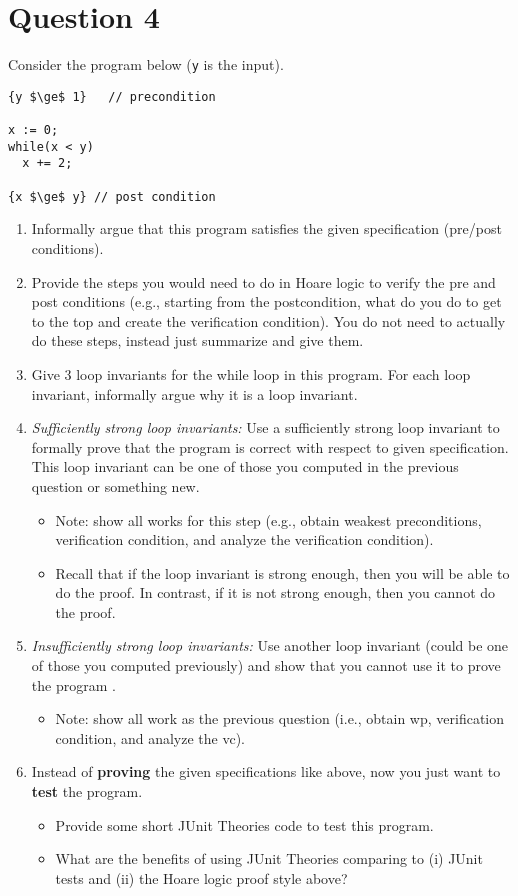 \documentclass[10pt]{article}
\begin{document}
\newpage
\section{Question 4}

Consider the program below (\texttt{y} is the input). 
\begin{lstlisting}
{y $\ge$ 1}   // precondition

x := 0;
while(x < y)
  x += 2;

{x $\ge$ y} // post condition
\end{lstlisting}


\begin{enumerate}
\item Informally argue that this program satisfies the given specification (pre/post conditions).
\item Provide the steps you would need to do in Hoare logic to verify the pre and post conditions (e.g., starting from the postcondition, what do you do to get to the top and create the verification condition). You do not need to actually do these steps, instead just summarize and give them.
  
\item Give 3 loop invariants for the while loop in this program. For each loop invariant, informally argue why it is a loop invariant.  
\item \emph{Sufficiently strong loop invariants:}  Use a sufficiently strong loop invariant to formally prove that the program is correct with respect to given specification. This loop invariant can be one of those you computed in the previous question or something new.
  \begin{itemize}
    \item Note: show all works for this step (e.g., obtain weakest preconditions, verification condition, and analyze the verification condition).
  \item Recall that if the loop invariant is strong enough, then you will be able to do the proof. In contrast, if it is not strong enough, then you cannot do the proof.
  \end{itemize}
\item \emph{Insufficiently strong loop invariants:} Use another loop invariant (could be one of those you computed previously) and show that you cannot use it to prove the program . 
  \begin{itemize}
    \item Note: show all work as the previous question (i.e., obtain wp, verification condition, and analyze the vc).
    \end{itemize}

  \item Instead of \textbf{proving} the given specifications like above, now you just want to \textbf{test} the program.
    \begin{itemize}
    \item Provide some short JUnit Theories code to test this program.
    \item What are the benefits of using JUnit Theories comparing to (i) JUnit tests and (ii) the Hoare logic proof style above?
    \end{itemize}
\end{enumerate}
\end{document}
